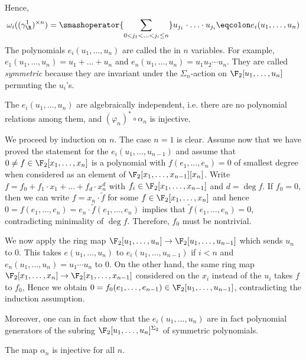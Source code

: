Hence, 
\begin{equation*}
	\omega_i((\gamma_\R^1)^{\times n}) = \smashoperator{\sum_{0 < j_1 < \ldots < j_i \leq n}} u_{j_1} \cdot \ldots \cdot u_{j_i} \eqcolon e_i(u_1, \ldots, u_n)
\end{equation*}
The polynomials $e_i(u_1, \ldots, u_n)$ are called the  in $n$ variables.
For example, $e_1(u_1, \ldots, u_n) = u_1 + \ldots + u_n$ and $e_n(u_1, \ldots, u_n) = u_1 u_2 \cdots u_n$.
They are called \emph{symmetric} because they are invariant under the $\Sigma_n$-action on $\F_2[u_1, \ldots, u_n]$ permuting the $u_i$'s.
\begin{proposition}
	The $e_i(u_1, \ldots, u_n)$ are algebraically independent, i.e. there are no polynomial relations among them, and $(\varphi_n)^* \circ \alpha_n$ is injective.
\end{proposition}
\begin{smallproof}
	We proceed by induction on $n$.
	The case $n = 1$ is clear.
	Assume now that we have proved the statement for the $e_i(u_1, \ldots, u_{n - 1})$ and assume that $0 \neq f \in \F_2[x_1, \ldots, x_n]$ is a polynomial with $f(e_1, \ldots, e_n) = 0$ of smallest degree when considered as an element of $\F_2[x_1, \ldots, x_{n - 1}][x_n]$.
	Write $f = f_0 + f_1 \cdot x_1 + \ldots + f_d \cdot x_n^d$ with $f_i \in \F_2[x_1, \ldots, x_{n - 1}]$ and $d = \deg f$.
	If $f_0 = 0$, then we can write $f = x_n \cdot \tilde{f}$ for some $f \in \F_2[x_1, \ldots, x_n]$ and hence $0 = f(e_1, \ldots, e_n) = e_n \cdot \tilde{f}(e_1, \ldots, e_n)$ implies that $\tilde{f}(e_1, \ldots, e_n) = 0$, contradicting minimality of $\deg f$.
	Therefore, $f_0$ must be nontrivial.

	We now apply the ring map $\F_2[u_1, \ldots, u_n] \to \F_2[u_1, \ldots, u_{n - 1}]$ which sends $u_n$ to 0.
	This takes $e(u_1, \ldots, u_n)$ to $e_i(u_1, \ldots, u_{n - 1})$ if $i < n$ and $e_n(u_1, \ldots, u_n) = u_1 \cdots u_n$ to 0.
	On the other hand, the same ring map $\F_2[x_1, \ldots, x_n] \to \F_2[x_1, \ldots, x_{n - 1}]$ considered on the $x_i$ instead of the $u_i$ takes $f$ to $f_0$, 
	Hence we obtain $0 = f_0(e_1, \ldots, e_{n - 1}) \in \F_2[u_1, \ldots, u_{n - 1}]$, contradicting the induction assumption.
\end{smallproof}
Moreover, one can in fact show that the $e_i(u_1, \ldots, u_n)$ are in fact polynomial generators of the subring $\F_2[u_1, \ldots, u_n]^{\Sigma_2}$ of symmetric polynomials.
\begin{corollary}
	The map $\alpha_n$ is injective for all $n$.
\end{corollary}
